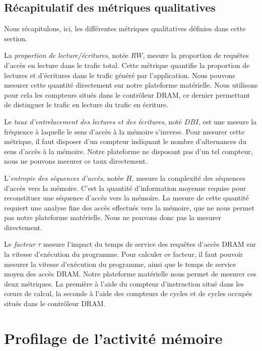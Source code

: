 \subsection{Récapitulatif des métriques qualitatives}

Nous récapitulons, ici, les différentes métriques qualitatives définies dans cette section.

La \emph{proportion de lecture/écritures}, notée $RW$, mesure la proportion de requêtes d'accès en lecture dans le trafic total.
Cette métrique quantifie la proportion de lectures et d'écritures dans le trafic généré par l'application.
Nous pouvons mesurer cette quantité directement sur notre plateforme matérielle. 
Nous utilisons pour cela les compteurs situés dans le contrôleur DRAM, ce dernier permettant de distinguer le trafic en lecture du trafic en écriture.

Le \emph{taux d'entrelacement des lectures et des écritures}, noté $DBI$, est une mesure la fréquence à laquelle le sens d'accès à la mémoire s'inverse.
Pour mesurer cette métrique, il faut disposer d'un compteur indiquant le nombre d'alternances du sens d'accès à la mémoire.
Notre plateforme ne disposant pas d'un tel compteur, nous ne pouvons mesurer ce taux directement.

L'\emph{entropie des séquences d'accès}, notée $H$, mesure la complexité des séquences d'accès vers la mémoire.
C'est la quantité d'information moyenne requise pour reconstituer une séquence d'accès vers la mémoire.
La mesure de cette quantité requiert une analyse fine des accès effectués vers la mémoire, que ne nous permet pas notre plateforme matérielle.
Nous ne pouvons donc pas la mesurer directement.

Le \emph{facteur $\tau$} mesure l'impact du temps de service des requêtes d'accès DRAM sur la vitesse d'exécution du programme.
Pour calculer ce facteur, il faut pouvoir mesurer la vitesse d'exécution du programme, ainsi que le temps de service moyen des accès DRAM.
Notre plateforme matérielle nous permet de mesurer ces deux métriques. La première à l'aide du compteur d'instruction situé dans les cœurs de calcul, la seconde à l'aide des compteurs de cycles et de cycles occupés situés dans le contrôleur DRAM. 


\section{\label{section:profileur}Profilage de l'activité mémoire}

